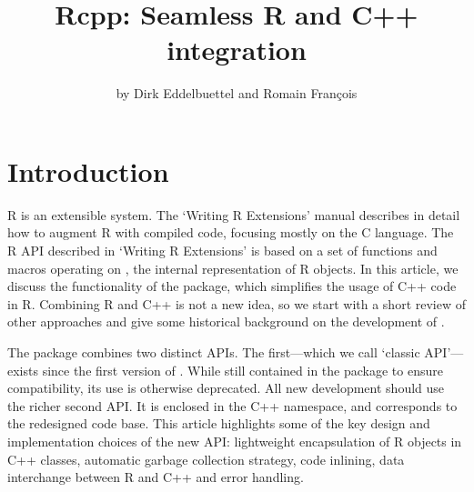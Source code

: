 
\title{Rcpp: Seamless R and C++ integration}
\author{by Dirk Eddelbuettel and Romain Fran\c{c}ois}

\maketitle


\section{Introduction} 

R is an extensible system. The `Writing R Extensions' manual \citep{R:exts}
describes in detail how to augment R with compiled code,
focusing mostly on the C language. The R API described in `Writing R Extensions' is
based on a set of functions and macros operating on , the internal
representation of R objects.
%
In this article, we discuss the functionality of the 
package, which simplifies the usage of C++ code
in R. Combining R and C++ is not a new idea, so we start with
a short review of other approaches and give some historical
background on the development of .

The  package combines two distinct
APIs. The first---which we call `classic  API'---exists since 
the first version of . While still contained in the package to
ensure compatibility, its use is otherwise deprecated. All new development should
use the richer second API. It is enclosed in the  C++ 
namespace, and corresponds to the redesigned code base. 
This article highlights some of the key design and implementation choices of
the new API: lightweight encapsulation of R objects in C++ classes, automatic
garbage collection strategy, code inlining, data interchange between R and
C++ and error handling.

